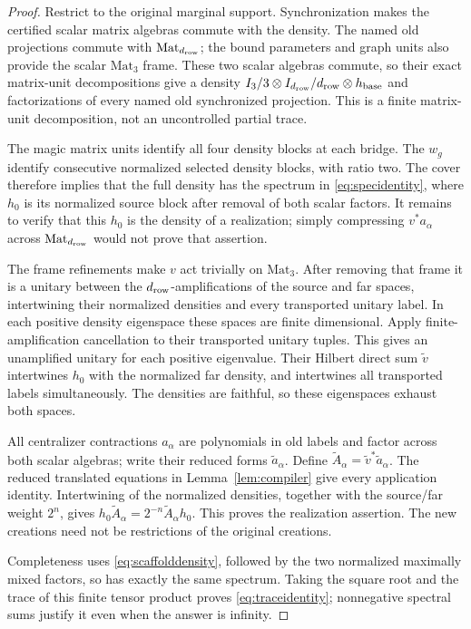\begin{proof}
Restrict to the original marginal support. Synchronization makes the certified scalar matrix algebras commute with the density. The named old projections commute with $\mathrm{Mat}_{d_{\mathrm{row}}}$; the bound parameters and graph units also provide the scalar $\mathrm{Mat}_3$ frame. These two scalar algebras commute, so their exact matrix-unit decompositions give a density $I_3/3\otimes I_{d_{\mathrm{row}}}/d_{\mathrm{row}}\otimes h_{\rm base}$ and factorizations of every named old synchronized projection. This is a finite matrix-unit decomposition, not an uncontrolled partial trace.

The magic matrix units identify all four density blocks at each bridge. The $w_g$ identify consecutive normalized selected density blocks, with ratio two. The cover therefore implies that the full density has the spectrum in \eqref{eq:specidentity}, where $h_0$ is its normalized source block after removal of both scalar factors. It remains to verify that this $h_0$ is the density of a realization; simply compressing $v^*a_\alpha$ across $\mathrm{Mat}_{d_{\mathrm{row}}}$ would not prove that assertion.

The frame refinements make $v$ act trivially on $\mathrm{Mat}_3$. After removing that frame it is a unitary between the $d_{\mathrm{row}}$-amplifications of the source and far spaces, intertwining their normalized densities and every transported unitary label. In each positive density eigenspace these spaces are finite dimensional. Apply finite-amplification cancellation to their transported unitary tuples. This gives an unamplified unitary for each positive eigenvalue. Their Hilbert direct sum $\widetilde v$ intertwines $h_0$ with the normalized far density, and intertwines all transported labels simultaneously. The densities are faithful, so these eigenspaces exhaust both spaces.

All centralizer contractions $a_\alpha$ are polynomials in old labels and factor across both scalar algebras; write their reduced forms $\widetilde a_\alpha$. Define
$\widetilde A_\alpha=\widetilde v^*\widetilde a_\alpha$.
The reduced translated equations in Lemma~\ref{lem:compiler} give every application identity. Intertwining of the normalized densities, together with the source/far weight $2^n$, gives $h_0\widetilde A_\alpha=2^{-n}\widetilde A_\alpha h_0$. This proves the realization assertion. The new creations need not be restrictions of the original creations.

Completeness uses \eqref{eq:scaffolddensity}, followed by the two normalized maximally mixed factors, so has exactly the same spectrum. Taking the square root and the trace of this finite tensor product proves \eqref{eq:traceidentity}; nonnegative spectral sums justify it even when the answer is infinity.
\end{proof}

